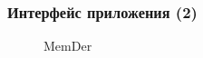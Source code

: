 \documentclass[xetex,mathserif,serif]{beamer}
\begin{document}
	\begin{frame}
		\frametitle{Интерфейс приложения (2)}
		\begin{figure}[h]
            \caption{MemDer}
            \label{fig:image}
        \end{figure}
	\end{frame}
	
\end{document}
